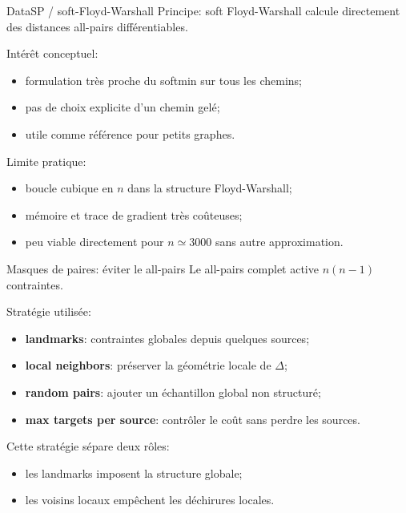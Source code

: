 \documentclass[aspectratio=169]{beamer}
\newcommand{\Dtarget}{\Delta}
\begin{document}
\begin{frame}{DataSP / soft-Floyd-Warshall}
  Principe: soft Floyd-Warshall calcule directement des distances all-pairs
  différentiables.

  \vspace{0.2cm}
  Intérêt conceptuel:
  \begin{itemize}
    \item formulation très proche du softmin sur tous les chemins;
    \item pas de choix explicite d'un chemin gelé;
    \item utile comme référence pour petits graphes.
  \end{itemize}

  \vspace{0.2cm}
  Limite pratique:
  \begin{itemize}
    \item boucle cubique en $n$ dans la structure Floyd-Warshall;
    \item mémoire et trace de gradient très coûteuses;
    \item peu viable directement pour $n\simeq 3000$ sans autre approximation.
  \end{itemize}
\end{frame}

\begin{frame}{Masques de paires: éviter le all-pairs}
  Le all-pairs complet active $n(n-1)$ contraintes.

  \vspace{0.2cm}
  Stratégie utilisée:
  \begin{itemize}
    \item \textbf{landmarks}: contraintes globales depuis quelques sources;
    \item \textbf{local neighbors}: préserver la géométrie locale de $\Dtarget$;
    \item \textbf{random pairs}: ajouter un échantillon global non structuré;
    \item \textbf{max targets per source}: contrôler le coût sans perdre les sources.
  \end{itemize}

  \vspace{0.2cm}
  Cette stratégie sépare deux rôles:
  \begin{itemize}
    \item les landmarks imposent la structure globale;
    \item les voisins locaux empêchent les déchirures locales.
  \end{itemize}
\end{frame}
\end{document}
